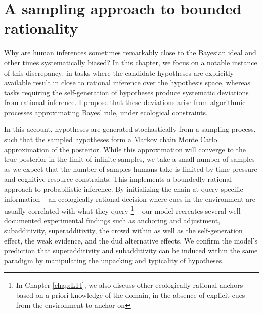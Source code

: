 



\chapter{A sampling approach to bounded rationality}
\label{chap:MCMC}


Why are human inferences sometimes remarkably close to the Bayesian ideal and other times systematically biased? In this chapter, we focus on a notable instance of this discrepancy: in tasks where the candidate hypotheses are explicitly available result in close to rational inference over the hypothesis space, whereas tasks requiring the self-generation of hypotheses produce systematic deviations from rational inference. I propose that these deviations arise from algorithmic processes approximating Bayes’ rule, under ecological constraints.

In this account, hypotheses are generated stochastically from a sampling process, such that the sampled hypotheses form a Markov chain Monte Carlo approximation of the posterior. While this approximation will converge to the true posterior in the limit of infinite samples, we take a small number of samples as we expect that the number of samples humans take is limited by time pressure and cognitive resource constraints. This implements a boundedly rational approach to probabilistic inference. By initializing the chain at query-specific information -- an ecologically rational decision where cues in the environment are usually correlated with what they query \footnote{In Chapter \ref{chap:LTI}, we also discuss other ecologically rational anchors based on a priori knowledge of the domain, in the absence of explicit cues from the environment to anchor on} -- our model recreates several well-documented experimental findings such as anchoring and adjustment, subadditivity, superadditivity, the crowd within as well as the self-generation effect, the weak evidence, and the dud alternative effects. We confirm the model’s prediction that superadditivity and subadditivity can be induced within the same paradigm by manipulating the unpacking and typicality of hypotheses. 

